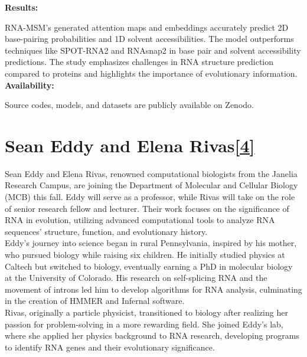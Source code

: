 \documentclass{article}
\begin{document}
\begin{large}
\begin{large}
\begin{large}
\textbf{Results:}\par

RNA-MSM’s generated attention maps and embeddings accurately predict 2D base-pairing probabilities and 1D solvent accessibilities.
The model outperforms techniques like SPOT-RNA2 and RNAsnap2 in base pair and solvent accessibility predictions.
The study emphasizes challenges in RNA structure prediction compared to proteins and highlights the importance of evolutionary information.\\[0.5em]

\textbf{Availability:}\par

Source codes, models, and datasets are publicly available on Zenodo.\\[0.5em]

\clearpage

\section{Sean Eddy and Elena Rivas\href{https://www.mcb.harvard.edu/department/news/mcb-welcomes-sean-eddy-and-elena-rivas/}{\textbf{[4]}}}

Sean Eddy and Elena Rivas, renowned computational biologists from the Janelia Research Campus, are joining the Department of Molecular and Cellular Biology (MCB) this fall. Eddy will serve as a professor, while Rivas will take on the role of senior research fellow and lecturer. Their work focuses on the significance of RNA in evolution, utilizing advanced computational tools to analyze RNA sequences' structure, function, and evolutionary history.\\[0.5em]

Eddy's journey into science began in rural Pennsylvania, inspired by his mother, who pursued biology while raising six children. He initially studied physics at Caltech but switched to biology, eventually earning a PhD in molecular biology at the University of Colorado. His research on self-splicing RNA and the movement of introns led him to develop algorithms for RNA analysis, culminating in the creation of HMMER and Infernal software.\\[0.5em]

Rivas, originally a particle physicist, transitioned to biology after realizing her passion for problem-solving in a more rewarding field. She joined Eddy's lab, where she applied her physics background to RNA research, developing programs to identify RNA genes and their evolutionary significance.\\[0.5em]


\end{large}
\end{large}
\end{large}
\end{document}
